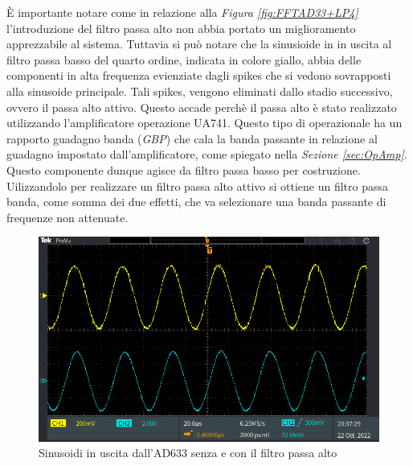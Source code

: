 \documentclass[titlepage]{report}
\begin{document}
	È importante notare come in relazione alla \textit{Figura \ref{fig:FFTAD33+LP4}} l'introduzione del filtro passa alto non abbia portato un miglioramento apprezzabile al sistema. Tuttavia si può notare che la sinusioide in in uscita al filtro passa basso del quarto ordine, indicata in colore giallo, abbia delle componenti in alta frequenza evienziate dagli spikes che si vedono sovrapposti alla sinusoide principale. Tali spikes, vengono eliminati dallo stadio successivo, ovvero il passa alto attivo. Questo accade perchè il passa alto è stato realizzato utilizzando l'amplificatore operazione UA741. Questo tipo di operazionale ha un rapporto guadagno banda (\textit{GBP}) che cala la banda passante in relazione al guadagno impostato dall'amplificatore, come spiegato nella \textit{Sezione \ref{sec:OpAmp}}. Questo componente dunque agisce da filtro passa basso per costruzione. Uilizzandolo per realizzare un filtro passa alto attivo si ottiene un filtro passa banda, come somma dei due effetti, che va selezionare una banda passante di frequenze non attenuate.
	 
	 \begin{figure}[H]
		\centering
		\includegraphics[scale = 0.5]{Immagini/sin_ad633+lp4_ad633+lp4+hp1.PNG}
		\caption{Sinusoidi in uscita dall'AD633 senza e con il filtro passa alto}
		\label{fig:AD33+LPconsenzaHP}
	\end{figure}
\end{document}
